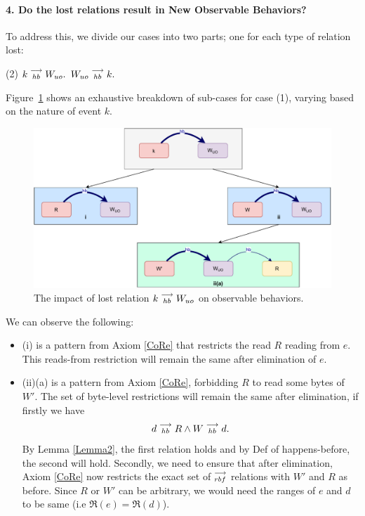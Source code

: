 \paragraph{4. Do the lost relations result in New Observable Behaviors?}

    To address this, we divide our cases into two parts; one for each type of relation lost:
    \begin{tasks}[style=enumerate](2)
        \task $k\stackrel{\longrightarrow}{_{hb}}W_{uo}.$
        \task $W_{uo}\stackrel{\longrightarrow}{_{hb}}k.$
    \end{tasks}

    Figure~\ref{elim_write:case1} shows an exhaustive breakdown of sub-cases for case (1), varying based
    on the nature of event $k$.
    \begin{figure}[H]
        \centering
        \includegraphics[scale=0.5]{5.Elimination/1.ValidEliminationCandidate/WriteElimProof/ProofParts/Part4Case1.pdf}
        \caption{The impact of lost relation $k\stackrel{\longrightarrow}{_{hb}}W_{uo}$ on observable behaviors.}
        \label{elim_write:case1}
    \end{figure}

    We can observe the following:
    \begin{itemize}
        \item (i) is a pattern from Axiom \ref{CoRe} that restricts the read $R$ reading from $e$. This reads-from restriction will remain the same after elimination of $e$. 
        \item (ii)(a) is a pattern from Axiom \ref{CoRe}, forbidding $R$ to read some bytes of $W'$. 
        The set of byte-level restrictions will remain the same after elimination, if firstly we have 
        \begin{align*}
            d\stackrel{\longrightarrow}{_{hb}}R \wedge W\stackrel{\longrightarrow}{_{hb}}d.
        \end{align*}
        By Lemma \ref{Lemma2}, the first relation holds and by Def of happens-before, the second will hold. 
        Secondly, we need to ensure that after elimination, Axiom \ref{CoRe} now restricts the exact set of $\stackrel{\longrightarrow}{_{rbf}}$ relations with $W'$ and $R$ as before. 
        Since $R$ or $W'$ can be arbitrary, we would need the ranges of $e$ and $d$ to be same (i.e $\Re(e) = \Re(d)$).
    \end{itemize}

